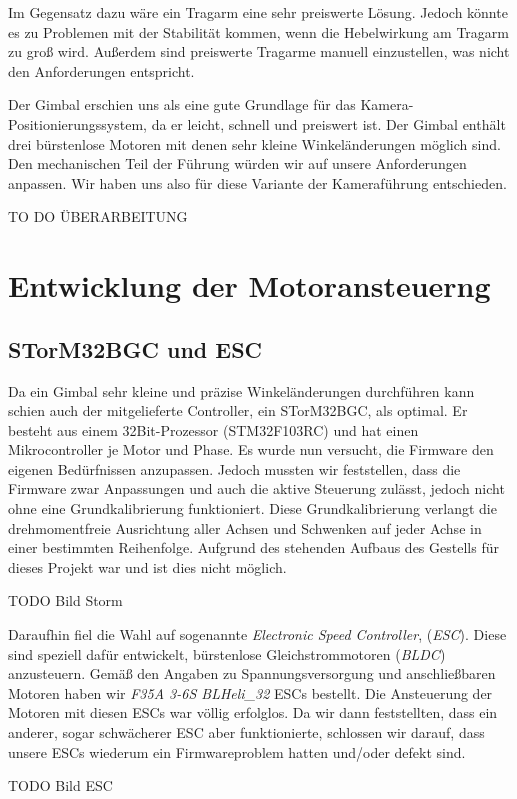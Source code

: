 \documentclass[12pt,a4paper,bibliography=totocnumbered,listof=totocnumbered]{scrartcl}
\begin{document}
Im Gegensatz dazu wäre ein Tragarm eine sehr preiswerte Lösung. Jedoch könnte es zu Problemen mit der Stabilität kommen, wenn die Hebelwirkung am Tragarm zu groß wird. Außerdem sind preiswerte Tragarme manuell einzustellen, was nicht den Anforderungen entspricht.

Der Gimbal erschien uns als eine gute Grundlage für das Kamera-Positionierungssystem, da er leicht, schnell und preiswert ist. Der Gimbal enthält drei bürstenlose Motoren mit denen sehr kleine Winkeländerungen möglich sind. Den mechanischen Teil der Führung würden wir auf unsere Anforderungen anpassen. Wir haben uns also für diese Variante der Kameraführung entschieden.

TO DO ÜBERARBEITUNG

\section{Entwicklung der Motoransteuerng}
\subsection{STorM32BGC und ESC}
Da ein Gimbal sehr kleine und präzise Winkeländerungen durchführen kann schien auch der mitgelieferte Controller, ein STorM32BGC, als optimal. Er besteht aus einem 32Bit-Prozessor (STM32F103RC) und hat einen Mikrocontroller je Motor und Phase. Es wurde nun versucht, die Firmware den eigenen Bedürfnissen anzupassen. Jedoch mussten wir feststellen, dass die Firmware zwar Anpassungen und auch die aktive Steuerung zulässt, jedoch nicht ohne eine Grundkalibrierung funktioniert. Diese Grundkalibrierung verlangt die drehmomentfreie Ausrichtung aller Achsen und Schwenken auf jeder Achse in einer bestimmten Reihenfolge. Aufgrund des stehenden Aufbaus des Gestells für dieses Projekt war und ist dies nicht möglich.

TODO Bild Storm

Daraufhin fiel die Wahl auf sogenannte \textit{Electronic Speed Controller}, (\textit{ESC}). Diese sind speziell dafür entwickelt, bürstenlose Gleichstrommotoren (\textit{BLDC}) anzusteuern. Gemäß den Angaben zu Spannungsversorgung und anschließbaren Motoren haben wir \textit{F35A 3-6S BLHeli\_32} ESCs bestellt. Die Ansteuerung der Motoren mit diesen ESCs war völlig erfolglos. Da wir dann feststellten, dass ein anderer, sogar schwächerer ESC aber funktionierte, schlossen wir darauf, dass unsere ESCs wiederum ein Firmwareproblem hatten und/oder defekt sind.

TODO Bild ESC
\end{document}
